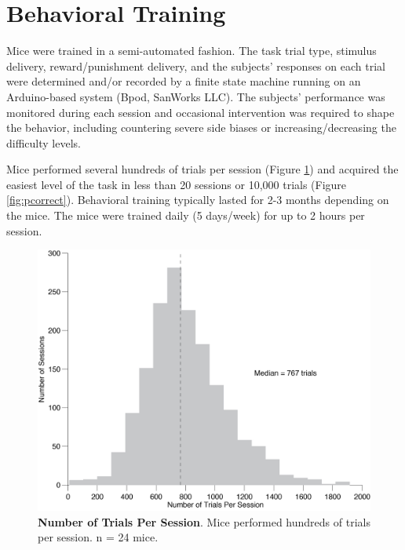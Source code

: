 \section{Behavioral Training}
Mice were trained in a semi-automated fashion. The task trial type, stimulus delivery, reward/punishment delivery, and the subjects' responses on each trial were determined and/or recorded by a finite state machine running on an Arduino-based system (Bpod, SanWorks LLC). The subjects' performance was  monitored during each session and occasional intervention was required to shape the behavior, including countering severe side biases or increasing/decreasing the difficulty levels. \par 
Mice performed several hundreds of trials per session (Figure \ref{fig:numTrials}) and acquired the easiest level of the task in less than 20 sessions or 10,000 trials (Figure \ref{fig:pcorrect}). Behavioral training typically lasted for 2-3 months depending on the mice. The mice were trained daily (5 days/week) for up to 2 hours per session.\par 
\begin{figure}
  \centering
  	\includegraphics[width=\textwidth]{Figures/chapter2/NumTrialsPerSessions24mice.png}
  \caption[Number of Trials Per Session]{\textbf{Number of Trials Per Session}. Mice performed hundreds of trials per session. n = 24 mice.}
   \label{fig:numTrials}
\end{figure}

